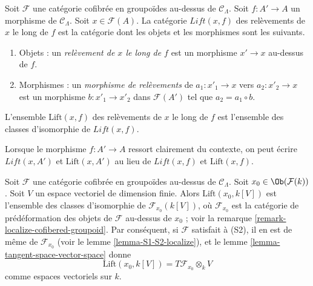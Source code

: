 \begin{definition}
\label{definition-lifts}
Soit $\mathcal{F}$ une catégorie cofibrée en groupoïdes au-dessus de
$\mathcal{C}_\Lambda$. Soit $f: A' \to A$ un morphisme de
$\mathcal{C}_\Lambda$. Soit $x \in \mathcal{F}(A)$. La catégorie
$\textit{Lift}(x, f)$ des relèvements de $x$ le long de $f$ est la catégorie
dont les objets et les morphismes sont les suivants.
\begin{enumerate}
\item Objets : un {\it relèvement de $x$ le long de $f$} est un morphisme
$x' \to x$ au-dessus de $f$.
\item Morphismes : un {\it morphisme de relèvements} de
$a_1 : x'_1 \to x$ vers $a_2 : x'_2 \to x$ est un morphisme
$b : x'_1 \to x'_2$ dans $\mathcal{F}(A')$ tel que $a_2 = a_1 \circ b$.
\end{enumerate}
L'ensemble $\text{Lift}(x, f)$ des relèvements de $x$ le long de $f$ est
l'ensemble des classes d'isomorphie de $\textit{Lift}(x, f)$.
\end{definition}

\begin{remark}
\label{remark-omit-arrow}
Lorsque le morphisme $f: A' \to A$ ressort clairement du contexte, on peut
écrire $\textit{Lift}(x, A')$ et $\text{Lift}(x, A')$ au lieu de
$\textit{Lift}(x, f)$ et $\text{Lift}(x, f)$.
\end{remark}

\begin{remark}
\label{remark-tangent-space-lifting}
Soit $\mathcal{F}$ une catégorie cofibrée en groupoïdes au-dessus de
$\mathcal{C}_\Lambda$. Soit $x_0 \in \Ob(\mathcal{F}(k))$. Soit $V$ un espace
vectoriel de dimension finie. Alors $\text{Lift}(x_0, k[V])$ est l'ensemble
des classes d'isomorphie de $\mathcal{F}_{x_0}(k[V])$, où
$\mathcal{F}_{x_0}$ est la catégorie de prédéformation des objets de
$\mathcal{F}$ au-dessus de $x_0$ ; voir la remarque
\ref{remark-localize-cofibered-groupoid}. Par conséquent, si $\mathcal{F}$
satisfait à (S2), il en est de même de $\mathcal{F}_{x_0}$ (voir le lemme
\ref{lemma-S1-S2-localize}), et le lemme
\ref{lemma-tangent-space-vector-space} donne
$$
\text{Lift}(x_0, k[V]) = T\mathcal{F}_{x_0} \otimes_k V
$$
comme espaces vectoriels sur $k$.
\end{remark}

